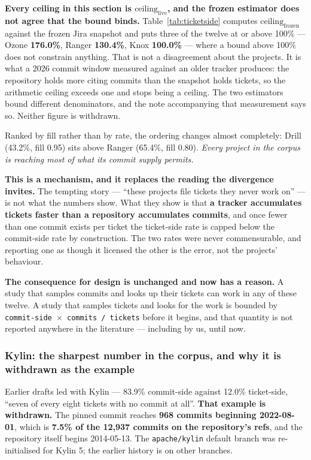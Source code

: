 \documentclass[11pt,a4paper]{article}
\begin{document}
\textbf{Every ceiling in this section is $\mathrm{ceiling}_\mathrm{live}$, and the frozen estimator does not agree that the bound binds.} Table~\ref{tab:ticketside} computes $\mathrm{ceiling}_\mathrm{frozen}$ against the frozen Jira snapshot and puts three of the twelve at or above 100\% --- Ozone \textbf{176.0\%}, Ranger \textbf{130.4\%}, Knox \textbf{100.0\%} --- where a bound above 100\% does not constrain anything. That is not a disagreement about the projects. It is what a 2026 commit window measured against an older tracker produces: the repository holds more citing commits than the snapshot holds tickets, so the arithmetic ceiling exceeds one and stops being a ceiling. The two estimators bound different denominators, and the note accompanying that measurement says so. Neither figure is withdrawn.

Ranked by fill rather than by rate, the ordering changes almost completely: Drill (43.2\%, fill 0.95) sits above Ranger (65.4\%, fill 0.80). \emph{Every project in the corpus is reaching most of what its commit supply permits.}

\textbf{This is a mechanism, and it replaces the reading the divergence invites.} The tempting story --- ``these projects file tickets they never work on'' --- is not what the numbers show. What they show is that \textbf{a tracker accumulates tickets faster than a repository accumulates commits}, and once fewer than one commit exists per ticket the ticket-side rate is capped below the commit-side rate by construction. The two rates were never commensurable, and reporting one as though it licensed the other is the error, not the projects' behaviour.

\textbf{The consequence for design is unchanged and now has a reason.} A study that samples commits and looks up their tickets can work in any of these twelve. A study that samples tickets and looks for the work is bounded by \texttt{commit-\allowbreak{}side $\times$ commits /\allowbreak{} tickets} before it begins, and that quantity is not reported anywhere in the literature --- including by us, until now.

\subsubsection{Kylin: the sharpest number in the corpus, and why it is withdrawn as the example}
\label{sec:4.2.1}

Earlier drafts led with Kylin --- 83.9\% commit-side against 12.0\% ticket-side, ``seven of every eight tickets with no commit at all''. \textbf{That example is withdrawn.} The pinned commit reaches \textbf{968 commits beginning 2022-08-01}, which is \textbf{7.5\% of the 12,937 commits on the repository's refs}, and the repository itself begins 2014-05-13. The \texttt{apache/\allowbreak{}kylin} default branch was re-initialised for Kylin 5; the earlier history is on other branches.
\end{document}
